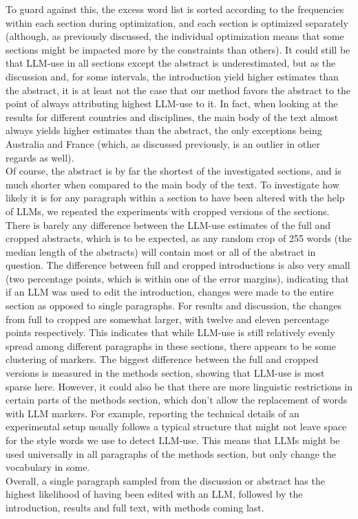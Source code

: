 To guard against this, the excess word list is sorted according to the frequencies within each section during optimization, and each section is optimized separately (although, as previously discussed, the individual optimization means that some sections might be impacted more by the constraints than others).
It could still be that LLM-use in all sections except the abstract is underestimated, but as the discussion and, for some intervals, the introduction yield higher estimates than the abstract, it is at least not the case that our method favors the abstract to the point of always attributing highest LLM-use to it.
In fact, when looking at the results for different countries and disciplines, the main body of the text almost always yields higher estimates than the abstract, the only exceptions being Australia and France (which, as discussed previously, is an outlier in other regards as well).
\\
Of course, the abstract is by far the shortest of the investigated sections, and is much shorter when compared to the main body of the text.
To investigate how likely it is for any paragraph within a section to have been altered with the help of LLMs, we repeated the experiments with cropped versions of the sections.
There is barely any difference between the LLM-use estimates of the full and cropped abstracts, which is to be expected, as any random crop of 255 words (the median length of the abstracts) will contain most or all of the abstract in question.
The difference between full and cropped introductions is also very small (two percentage points, which is within one of the error margins), indicating that if an LLM was used to edit the introduction, changes were made to the entire section as opposed to single paragraphs.
For results and discussion, the changes from full to cropped are somewhat larger, with twelve and eleven percentage points respectively.
This indicates that while LLM-use is still relatively evenly spread among different paragraphs in these sections, there appears to be some clustering of markers.
The biggest difference between the full and cropped versions is measured in the methods section, showing that LLM-use is most sparse here.
However, it could also be that there are more linguistic restrictions in certain parts of the methods section, which don't allow the replacement of words with LLM markers. 
For example, reporting the technical details of an experimental setup usually follows a typical structure that might not leave space for the style words we use to detect LLM-use.
This means that LLMs might be used universally in all paragraphs of the methods section, but only change the vocabulary in some.
\\
Overall, a single paragraph sampled from the discussion or abstract has the highest likelihood of having been edited with an LLM, followed by the introduction, results and full text, with methods coming last.


